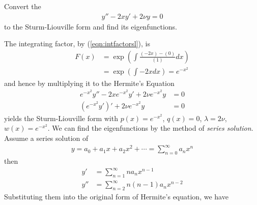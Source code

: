 \begin{exmp}
\label{exmp:hermiteeqn}
Convert the 
\begin{align}
y'' - 2xy' + 2\nu y = 0
\end{align}
to the Sturm-Liouville form and find its eigenfunctions.
\end{exmp}
\begin{solution}
The integrating factor, by (\ref{eqn:intfactorsl}), is
\begin{align*}
F(x) &= \exp(\int \frac{(-2x) - (0)}{(1)} dx) \\
&= \exp(\int -2x dx) = e^{-x^2}
\end{align*}
and hence by multiplying it to the Hermite's Equation
\begin{align}
e^{-x^2}y'' - 2xe^{-x^2}y' + 2\nu e^{-x^2} y &= 0 \nonumber \\
(e^{-x^2}y')' + 2\nu e^{-x^2} y &= 0
\end{align}
yields the Sturm-Liouville form with $p(x) = e^{-x^2}$, $q(x) = 0$, $\lambda = 2\nu$, $w(x) = e^{-x^2}$. We can find the eigenfunctions by the method of \textit{series solution}. Assume a series solution of 
\begin{align}
y = a_0 + a_1x + a_2x^2 + \cdots = \sum_{n=0}^{\infty} a_n x^n    
\end{align}
then
\begin{subequations}
\begin{align}
y' &= \sum_{n=1}^{\infty} n a_nx^{n-1} \\
y'' &= \sum_{n=2}^{\infty} n(n-1) a_nx^{n-2}
\end{align}    
\end{subequations}
Substituting them into the original form of Hermite's equation, we have
\begin{align}

\end{align}
\end{solution}
